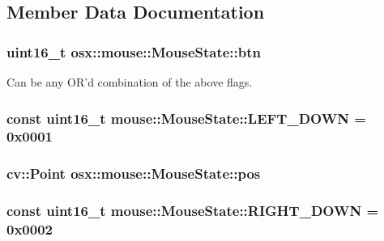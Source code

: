 \subsection{Member Data Documentation}
\hypertarget{structosx_1_1mouse_1_1_mouse_state_a2463a45ed53f3952c6d9a544a5dd680b}{
\subsubsection[{btn}]{\setlength{\rightskip}{0pt plus 5cm}uint16\-\_\-t {\bf osx\-::mouse\-::\-Mouse\-State\-::btn}}}\label{structosx_1_1mouse_1_1_mouse_state_a2463a45ed53f3952c6d9a544a5dd680b}
Can be any O\-R'd combination of the above flags. \hypertarget{structosx_1_1mouse_1_1_mouse_state_a9490a7acba9726f815fa3246985da50b}{
\subsubsection[{L\-E\-F\-T\-\_\-\-D\-O\-W\-N}]{\setlength{\rightskip}{0pt plus 5cm}const uint16\-\_\-t {\bf mouse\-::\-Mouse\-State\-::\-L\-E\-F\-T\-\_\-\-D\-O\-W\-N} = 0x0001}}\label{structosx_1_1mouse_1_1_mouse_state_a9490a7acba9726f815fa3246985da50b}
\hypertarget{structosx_1_1mouse_1_1_mouse_state_ae5404fd7615addf7c40e15ebb4af7f97}{
\subsubsection[{pos}]{\setlength{\rightskip}{0pt plus 5cm}cv\-::\-Point {\bf osx\-::mouse\-::\-Mouse\-State\-::pos}}}\label{structosx_1_1mouse_1_1_mouse_state_ae5404fd7615addf7c40e15ebb4af7f97}
\hypertarget{structosx_1_1mouse_1_1_mouse_state_a23bf52536a66f3ca8f3d1cebb0f401ee}{
\subsubsection[{R\-I\-G\-H\-T\-\_\-\-D\-O\-W\-N}]{\setlength{\rightskip}{0pt plus 5cm}const uint16\-\_\-t {\bf mouse\-::\-Mouse\-State\-::\-R\-I\-G\-H\-T\-\_\-\-D\-O\-W\-N} = 0x0002}}\label{structosx_1_1mouse_1_1_mouse_state_a23bf52536a66f3ca8f3d1cebb0f401ee}
